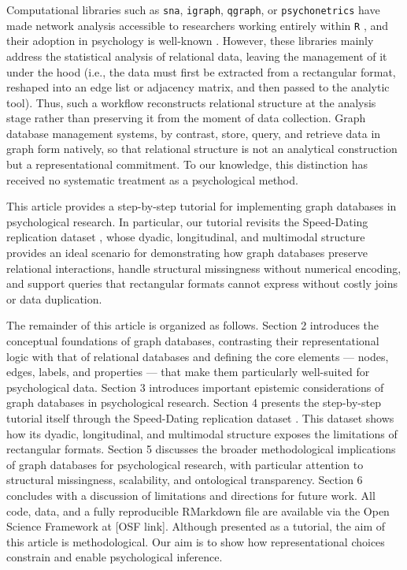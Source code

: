 \documentclass[sn-apa,pdflatex]{sn-jnl}
\theoremstyle{remark}
\theoremstyle{definition}
\begin{document}
Computational libraries such as \texttt{sna}, \texttt{igraph},
\texttt{qgraph}, or \texttt{psychonetrics} have made network analysis
accessible to researchers working entirely within \texttt{R}
\citep{Luke2015}, and their adoption in psychology is well-known
\citep{Mair2018}. However, these libraries mainly address the
statistical analysis of relational data, leaving the management of it
under the hood (i.e., the data must first be extracted from a
rectangular format, reshaped into an edge list or adjacency matrix, and
then passed to the analytic tool). Thus, such a workflow reconstructs
relational structure at the analysis stage rather than preserving it
from the moment of data collection. Graph database management systems,
by contrast, store, query, and retrieve data in graph form natively, so
that relational structure is not an analytical construction but a
representational commitment. To our knowledge, this distinction has
received no systematic treatment as a psychological method.

This article provides a step-by-step tutorial for implementing graph
databases in psychological research. In particular, our tutorial
revisits the Speed-Dating replication dataset
\citep{Selterman2015, Selterman2023}, whose dyadic, longitudinal, and
multimodal structure provides an ideal scenario for demonstrating how
graph databases preserve relational interactions, handle structural
missingness without numerical encoding, and support queries that
rectangular formats cannot express without costly joins or data
duplication.

The remainder of this article is organized as follows. Section 2
introduces the conceptual foundations of graph databases, contrasting
their representational logic with that of relational databases and
defining the core elements --- nodes, edges, labels, and properties ---
that make them particularly well-suited for psychological data. Section
3 introduces important epistemic considerations of graph databases in
psychological research. Section 4 presents the step-by-step tutorial
itself through the Speed-Dating replication dataset
\citep{Selterman2023}. This dataset shows how its dyadic, longitudinal,
and multimodal structure exposes the limitations of rectangular formats.
Section 5 discusses the broader methodological implications of graph
databases for psychological research, with particular attention to
structural missingness, scalability, and ontological transparency.
Section 6 concludes with a discussion of limitations and directions for
future work. All code, data, and a fully reproducible RMarkdown file are
available via the Open Science Framework at {[}OSF link{]}. Although
presented as a tutorial, the aim of this article is methodological. Our
aim is to show how representational choices constrain and enable
psychological inference.
\end{document}
